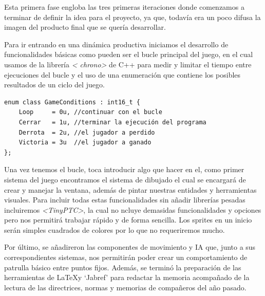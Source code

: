 \newpage

Esta primera fase engloba las tres primeras iteraciones donde comenzamos a terminar de definir 
la idea para el proyecto, ya que, todavía era un poco difusa la imagen del producto final que se
quería desarrollar.

Para ir entrando en una dinámica productiva iniciamos el desarrollo de funcionalidades básicas 
como pueden ser el bucle principal del juego, en el cual usamos de la librería \textit{\textless
chrono\textgreater} de C++ para medir y limitar el tiempo entre ejecuciones del bucle y el uso 
de una enumeración que contiene los posibles resultados de un ciclo del juego.

\begin{lstlisting}[style=CodigoC++, caption={Resultados iteración bucle},label=game_conditions]
enum class GameConditions : int16_t {
    Loop     = 0u, //continuar con el bucle
    Cerrar   = 1u, //terminar la ejecución del programa
    Derrota  = 2u, //el jugador a perdido
    Victoria = 3u  //el jugador a ganado
};
\end{lstlisting}

Una vez tenemos el bucle, toca introducir algo que hacer en el, como primer sistema del juego
encontramos el sistema de dibujado el cual se encargará de crear y manejar la ventana, además
de pintar nuestras entidades y herramientas visuales. Para incluir todas estas funcionalidades
sin añadir librerías pesadas incluiremos \textit{\textless TinyPTC\textgreater}, la cual no 
ncluye demasidas funcionalidades y opciones pero nos permitirá trabajar rápido y de forma 
sencilla. Los sprites en un inicio serán simples cuadrados de colores por lo que no requeriremos 
mucho.

Por último, se añadireron las componentes de movimiento y \ac{IA} que, junto a sus correspondientes
sistemas, nos permitirán poder crear un comportamiento de patrulla básico entre puntos fijos.
Además, se terminó la preparación de las herramientas de \LaTeX y `Jabref' para redactar la 
memoria acompañado de la lectura de las directrices, normas y memorias de compañeros del año 
pasado.

